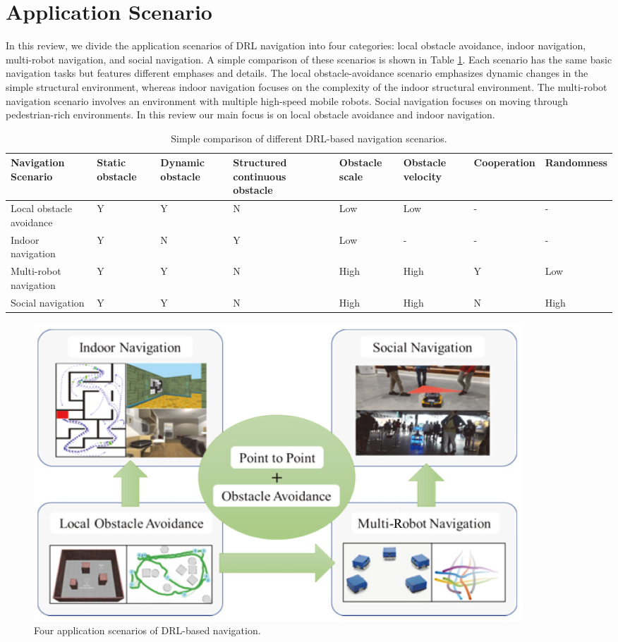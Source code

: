 \newpage
\section{Application Scenario}
\label{chapter2}
\textit{}

In this review, we divide the application scenarios of DRL navigation into four categories: local obstacle avoidance, indoor navigation, multi-robot navigation, and social navigation. A simple comparison of these scenarios is shown in Table \ref{tb:drlNav}. Each scenario has
the same basic navigation tasks but features different emphases and details. The local obstacle-avoidance scenario emphasizes dynamic changes in the simple structural environment, whereas indoor navigation
focuses on the complexity of the indoor structural environment. The multi-robot navigation scenario involves an environment with multiple high-speed mobile robots. Social navigation focuses on moving through pedestrian-rich environments. In this review our main focus is on local obstacle avoidance and indoor navigation.

\begin{table}[H]
\caption{Simple comparison of different DRL-based navigation scenarios.}
\label{table:symbols}
\begin{tabular}{p{2cm}p{1.5cm}p{1.5cm}p{1.5cm}p{1.5cm}p{1.5cm}p{2cm}p{1.5cm}}
\hline
Navigation Scenario & Static obstacle & Dynamic obstacle & Structured continuous obstacle & Obstacle scale & Obstacle velocity & Cooperation & Randomness \\ \hline
Local obstacle avoidance & Y & Y  & N & Low & Low & - & - \\
Indoor navigation & Y & N  & Y & Low & - & - & - \\
Multi-robot navigation & Y & Y  & N & High & High & Y & Low \\
Social navigation & Y & Y  & N & High & High & N & High\\ \hline
\end{tabular}
\label{tb:drlNav}

\end{table}

\begin{figure}[h!]
	\centering
	\includegraphics[width=0.8\linewidth]{figures/Drl-based-navigation.png}
	\caption{Four application scenarios of DRL-based navigation.}
	\label{fig:DRLNavScenario}
\end{figure}


